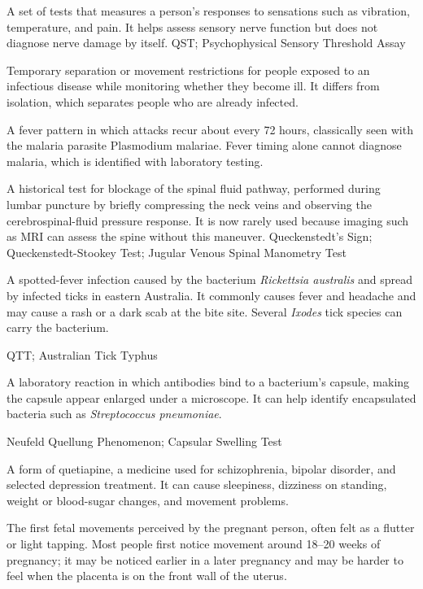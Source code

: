  A set of tests that measures a person's responses to sensations such as vibration, temperature, and pain. It helps assess sensory nerve function but does not diagnose nerve damage by itself.
\synonyms
QST; Psychophysical Sensory Threshold Assay

 Temporary separation or movement restrictions for people exposed to an infectious disease while monitoring whether they become ill. It differs from isolation, which separates people who are already infected.

 A fever pattern in which attacks recur about every 72 hours, classically seen with the malaria parasite Plasmodium malariae. Fever timing alone cannot diagnose malaria, which is identified with laboratory testing.

 A historical test for blockage of the spinal fluid pathway, performed during lumbar puncture by briefly compressing the neck veins and observing the cerebrospinal-fluid pressure response. It is now rarely used because imaging such as MRI can assess the spine without this maneuver.
\synonyms
Queckenstedt's Sign; Queckenstedt-Stookey Test; Jugular Venous Spinal Manometry Test

 A spotted-fever infection caused by the bacterium \textit{Rickettsia australis} and spread by infected ticks in eastern Australia. It commonly causes fever and headache and may cause a rash or a dark scab at the bite site. Several \textit{Ixodes} tick species can carry the bacterium.

\synonyms
QTT; Australian Tick Typhus

 A laboratory reaction in which antibodies bind to a bacterium's capsule, making the capsule appear enlarged under a microscope. It can help identify encapsulated bacteria such as \textit{Streptococcus pneumoniae}.

\synonyms
Neufeld Quellung Phenomenon; Capsular Swelling Test

 A form of quetiapine, a medicine used for schizophrenia, bipolar disorder, and selected depression treatment. It can cause sleepiness, dizziness on standing, weight or blood-sugar changes, and movement problems.

 The first fetal movements perceived by the pregnant person, often felt as a flutter or light tapping. Most people first notice movement around 18--20 weeks of pregnancy; it may be noticed earlier in a later pregnancy and may be harder to feel when the placenta is on the front wall of the uterus.

